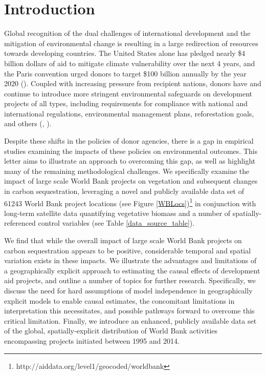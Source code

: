 \documentclass[sustainability,article,submit,moreauthors,pdftex,10pt,a4paper]{mdpi}
\begin{document}
\section{Introduction}

Global recognition of the dual challenges of international development and the mitigation of environmental change is resulting in a large redirection of resources towards developing countries. The United States alone has pledged nearly \$4 billion dollars of aid to mitigate climate vulnerability over the next 4 years, and the Paris convention urged donors to target \$100 billion annually by the year 2020 (\cite{royal_united_2015}). 
Coupled with increasing pressure from recipient nations, donors have and continue to introduce more stringent environmental safeguards on development projects of all types, including requirements for compliance with national and international regulations, environmental management plans, reforestation goals, and others (\cite{nielson_delegation_2003}, \cite{gutner_explaining_2005}).
\par
Despite these shifts in the policies of donor agencies, there is a gap in empirical studies examining the impacts of these policies on environmental outcomes. This letter aims to illustrate an approach to overcoming this gap, as well as highlight many of the remaining methodological challenges. We specifically examine the impact of large scale World Bank projects on vegetation and subsequent changes in carbon sequestration, leveraging a novel and publicly available data set of 61243 World Bank project locations (see Figure \ref{WBLocs})\footnote{http://aiddata.org/level1/geocoded/worldbank} in conjunction with long-term satellite data quantifying vegetative biomass and a number of spatially-referenced control variables (see Table \ref{data_source_table}).
\par
We find that while the overall impact of large scale World Bank projects on carbon sequestration appears to be positive, considerable temporal and spatial variation exists in these impacts. We illustrate the advantages and limitations of a geographically explicit approach to estimating the causal effects of development aid projects, and outline a number of topics for further research. Specifically, we discuss the need for hard assumptions of model independence in geographically explicit models to enable causal estimates, the concomitant limitations in interpretation this necessitates, and possible pathways forward to overcome this critical limitation. Finally, we introduce an enhanced, publicly available data set of the global, spatially-explicit distribution of World Bank activities encompassing projects initiated between 1995 and 2014.
\end{document}
